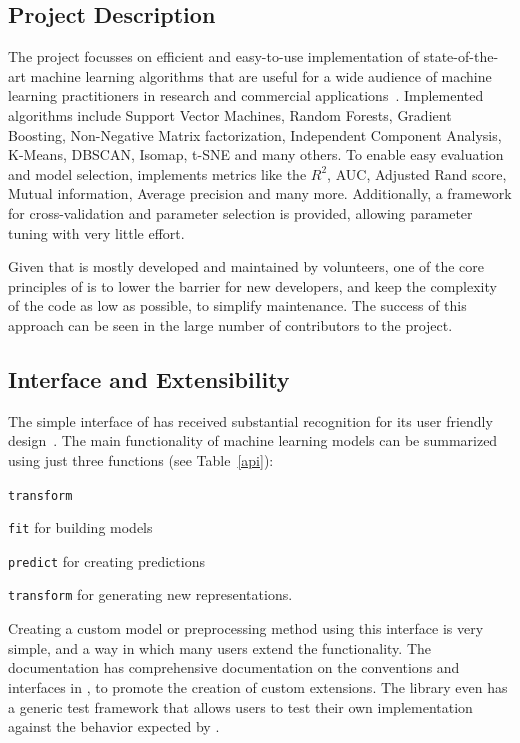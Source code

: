\subsection{Project Description}
The \sklearn{} project focusses on efficient and easy-to-use implementation
of state-of-the-art machine learning algorithms that are useful for a wide
audience of machine learning practitioners in research and commercial
applications~\cite{pedregosa2011scikit, buitinck2013api}.
Implemented algorithms include Support Vector Machines, Random Forests, Gradient Boosting,
Non-Negative Matrix factorization, Independent Component Analysis, K-Means, DBSCAN, Isomap,
t-SNE and many others. To enable easy evaluation and model selection, \sklearn{}
implements metrics like the $R^2$, AUC, Adjusted Rand score, Mutual information, Average precision
and many more. Additionally, a framework for cross-validation and parameter selection is
provided, allowing parameter tuning with very little effort.

Given that \sklearn{} is mostly developed and maintained by volunteers,
one of the core principles of \sklearn{} is to lower the barrier for new developers,
and keep the complexity of the code as low as possible, to simplify maintenance.
The success of this approach can be seen in the large number of contributors to
the project.

\subsection{Interface and Extensibility}
The simple interface of \sklearn{} has received substantial
recognition for its user friendly design~\cite{benlorica, testimonials}.
The main functionality of machine learning models can
be summarized using just three functions (see Table~\ref{api}):
\begin{labeling}{\texttt{transform}}
    \itemsep-4pt
    \item[\texttt{fit}] for building models
    \item[\texttt{predict}] for creating predictions
    \item[\texttt{transform}] for generating new representations.
\end{labeling}
Creating a custom model or preprocessing method using this interface is very simple,
and a way in which many users extend the functionality. The \sklearn{} documentation
has comprehensive documentation on the conventions and interfaces in \sklearn{},
to promote the creation of custom extensions.
The \sklearn{} library even has a generic test framework that allows users to
test their own implementation against the behavior expected by \sklearn{}.

